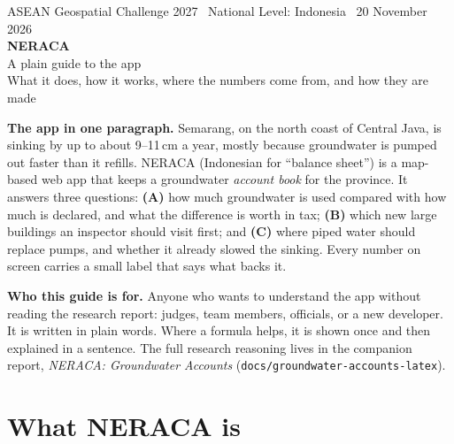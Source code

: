 \documentclass[11pt,a4paper]{article}
\begin{document}
\thispagestyle{empty}
\begin{center}
{\sffamily\scriptsize\color{muted} ASEAN Geospatial Challenge 2027 \textbullet\ National Level: Indonesia \textbullet\ 20 November 2026}\\[4mm]
{\sffamily\bfseries\fontsize{26}{30}\selectfont\color{ink} NERACA}\\[2mm]
{\sffamily\Large\color{accent} A plain guide to the app}\\[1.5mm]
{\sffamily\normalsize\color{muted} What it does, how it works, where the numbers come from, and how they are made}
\end{center}
\vspace{2mm}

\begin{tcolorbox}[enhanced,colback=accent,colframe=accent,boxrule=0pt,arc=2pt,left=10pt,right=10pt,top=8pt,bottom=8pt]
\sffamily\color{white}\textbf{The app in one paragraph.} Semarang, on the north coast of Central Java, is sinking
by up to about 9--11\,cm a year, mostly because groundwater is pumped out faster than it refills. NERACA
(Indonesian for ``balance sheet'') is a map-based web app that keeps a groundwater \emph{account book} for
the province. It answers three questions: \textbf{(A)} how much groundwater is used compared with how much
is declared, and what the difference is worth in tax; \textbf{(B)} which new large buildings an inspector
should visit first; and \textbf{(C)} where piped water should replace pumps, and whether it already slowed
the sinking. Every number on screen carries a small label that says what backs it.
\end{tcolorbox}

\vspace{1mm}
\textbf{Who this guide is for.} Anyone who wants to understand the app without reading the research
report: judges, team members, officials, or a new developer. It is written in plain words. Where a formula
helps, it is shown once and then explained in a sentence. The full research reasoning lives in the
companion report, \emph{NERACA: Groundwater Accounts} (\texttt{docs/groundwater-accounts-latex}).

\setcounter{tocdepth}{2}
{\small\tableofcontents}

\section{What NERACA is}\label{sec:what}
\end{document}
